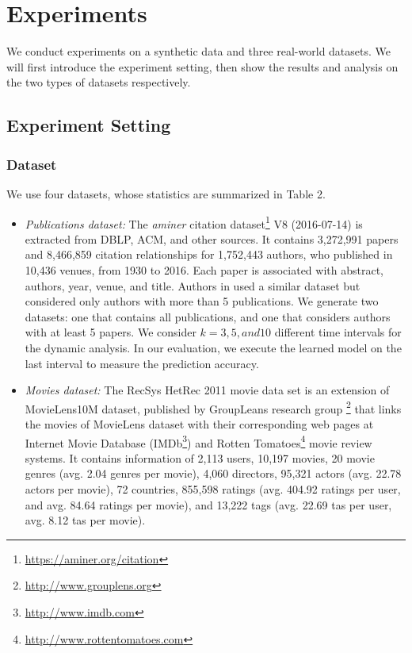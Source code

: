 \section{Experiments}


We conduct experiments on a synthetic data and three real-world datasets. We will first introduce the experiment setting, then show the results and analysis on the two types of datasets respectively.


\subsection{Experiment Setting}

\subsubsection{Dataset} We use four datasets, whose statistics are summarized in Table 2.

\begin{itemize}
    \item \textit{Publications dataset:} The \textit{aminer} citation dataset\footnote{\url{https://aminer.org/citation}} V8 (2016-07-14) is extracted from DBLP, ACM, and other sources. It contains 3,272,991 papers and 8,466,859 citation relationships for 1,752,443 authors, who published in 10,436 venues, from 1930 to 2016. Each paper is associated with abstract, authors, year, venue, and title.  Authors in \cite{sun2011ASONAM} used a similar dataset but considered only authors with more than 5 publications. We generate two datasets: one that contains all publications, and one that considers authors with at least 5 papers. We consider $k=3, 5, and 10$ different time intervals for the dynamic analysis. In our evaluation, we execute the learned model on the last interval to measure the prediction accuracy.
    
    \item \textit{Movies dataset:} The RecSys HetRec 2011 movie data set \cite{Cantador:RecSys2011} is an extension of MovieLens10M dataset, published by GroupLeans research group \footnote{\url{http://www.grouplens.org}} that links the movies of MovieLens dataset with their corresponding web pages at Internet Movie Database (IMDb\footnote{\url{http://www.imdb.com}}) and Rotten Tomatoes\footnote{\url{http://www.rottentomatoes.com}} movie review systems. It contains information of 2,113 users, 10,197 movies, 20 movie genres (avg. 2.04 genres per movie), 4,060 directors, 95,321 actors (avg. 22.78 actors per movie), 72 countries, 855,598 ratings (avg. 404.92 ratings per user, and avg. 84.64 ratings per movie), and 13,222 tags (avg. 22.69 tas per user, avg. 8.12 tas per movie).

\end{itemize}


